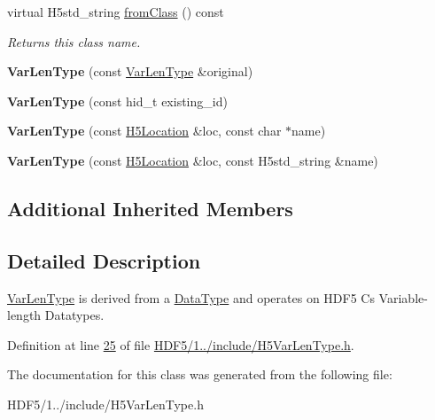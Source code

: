 \begin{DoxyCompactItemize}
\mbox{\label{class_h5_1_1_var_len_type_a781d7c99f66c97e3b09039151ce9158c}} 
virtual H5std\+\_\+string \hyperlink{class_h5_1_1_var_len_type_a781d7c99f66c97e3b09039151ce9158c}{from\+Class} () const
\begin{DoxyCompactList}\small\item\em Returns this class name. \end{DoxyCompactList}\item 
\mbox{\label{class_h5_1_1_var_len_type_adeb826c9c1d66db024f7b7490cf2800c}} 
{\bfseries Var\+Len\+Type} (const \hyperlink{class_h5_1_1_var_len_type}{Var\+Len\+Type} \&original)
\item 
\mbox{\label{class_h5_1_1_var_len_type_a39d795077e0be23b952bfc40987861fa}} 
{\bfseries Var\+Len\+Type} (const hid\+\_\+t existing\+\_\+id)
\item 
\mbox{\label{class_h5_1_1_var_len_type_aa6a06d518116dca0c4ba4800e98125b6}} 
{\bfseries Var\+Len\+Type} (const \hyperlink{class_h5_1_1_h5_location}{H5\+Location} \&loc, const char $\ast$name)
\item 
\mbox{\label{class_h5_1_1_var_len_type_aeb26aa2407f4a9ad0f7a6bb4baff1f08}} 
{\bfseries Var\+Len\+Type} (const \hyperlink{class_h5_1_1_h5_location}{H5\+Location} \&loc, const H5std\+\_\+string \&name)
\end{DoxyCompactItemize}
\subsection*{Additional Inherited Members}


\subsection{Detailed Description}
\hyperlink{class_h5_1_1_var_len_type}{Var\+Len\+Type} is derived from a \hyperlink{class_h5_1_1_data_type}{Data\+Type} and operates on H\+D\+F5 C\textquotesingle{}s Variable-\/length Datatypes. 

Definition at line \hyperlink{_h_d_f5_21_810_81_2include_2_h5_var_len_type_8h_source_l00025}{25} of file \hyperlink{_h_d_f5_21_810_81_2include_2_h5_var_len_type_8h_source}{H\+D\+F5/1../include/\+H5\+Var\+Len\+Type.\+h}.



The documentation for this class was generated from the following file\+:\begin{DoxyCompactItemize}
\item 
H\+D\+F5/1../include/\+H5\+Var\+Len\+Type.\+h\end{DoxyCompactItemize}
